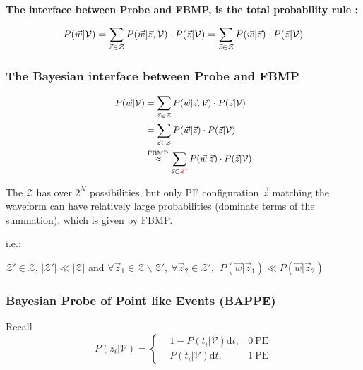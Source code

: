 \documentclass{beamer}
\newcommand{\dd}{\mathrm{d}}
\begin{document}
\begin{CJK*}{UTF8}{gbsn}
\begin{frame}
   \textbf{The interface between Probe and FBMP, is {\color{red} the total probability rule} :}

    \begin{equation}
        \small
        P(\vec{w}|\mathcal{V}) = \sum_{\vec{z} \in \mathcal{Z}} P(\vec{w}|\vec{z},\mathcal{V}) \cdot P(\vec{z}|\mathcal{V}) = \sum_{\vec{z} \in \mathcal{Z}} P(\vec{w}|\vec{z}) \cdot P(\vec{z}|\mathcal{V})
        \label{eq:3}
    \end{equation}
\end{frame}

\begin{frame}
    \frametitle{The Bayesian interface between Probe and FBMP}
    
    \begin{equation}
        \small
        \begin{aligned}
            P(\vec{w}|\mathcal{V}) & = \sum_{\vec{z} \in \mathcal{Z}} P(\vec{w}|\vec{z},\mathcal{V}) \cdot P(\vec{z}|\mathcal{V}) \\
            & = \sum_{\vec{z} \in \mathcal{Z}} P(\vec{w}|\vec{z}) \cdot P(\vec{z}|\mathcal{V}) \\
            & \overset{\text{FBMP}}{\approx} \sum_{\vec{z} \in \textcolor{red}{\mathcal{Z}'}} P(\vec{w}|\vec{z}) \cdot P(\vec{z}|\mathcal{V})
        \end{aligned}
    \end{equation}
    
    The $\mathcal{Z}$ has over $2^N$ possibilities, but only PE configuration $\vec{z}$ matching the waveform can have relatively large probabilities (dominate terms of the summation), which is given by FBMP. 

    i.e.: 

    $\mathcal{Z}' \in \mathcal{Z}$, $|\mathcal{Z}'| \ll |\mathcal{Z}|$ and $\forall \vec{z}_1 \in \mathcal{Z} \backslash \mathcal{Z}',\ \forall \vec{z}_2 \in \mathcal{Z}' ,\ \ P(\vec{w}|\vec{z}_1) \ll P(\vec{w}|\vec{z}_2)$
\end{frame}

\begin{frame}
    \frametitle{Bayesian Probe of Point like Events (BAPPE)}
    
    Recall 
    \begin{equation*}
        P({z}_i|\mathcal{V}) = \left\{ 
            \begin{aligned}
                & 1-P(t_i|\mathcal{V}) \dd t, & 0\ \mathrm{PE} \\
                & P(t_i|\mathcal{V}) \dd t , & 1\ \mathrm{PE}
            \end{aligned}
        \right.
    \end{equation*}


\end{frame}
\end{CJK*}
\end{document}
